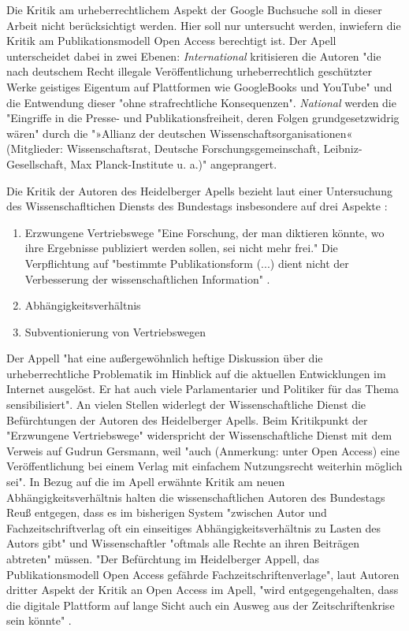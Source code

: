 Die Kritik am urheberrechtlichem Aspekt der Google Buchsuche soll in dieser Arbeit nicht berücksichtigt werden. Hier soll nur untersucht werden, inwiefern die Kritik am Publikationsmodell Open Access berechtigt ist. Der Apell unterscheidet dabei in zwei Ebenen: \textit{International} kritisieren die Autoren "die nach deutschem Recht illegale Veröffentlichung urheberrechtlich geschützter Werke geistiges Eigentum auf Plattformen wie GoogleBooks und YouTube" und die Entwendung dieser "ohne strafrechtliche Konsequenzen". \textit{National} werden die "Eingriffe in die Presse- und Publikationsfreiheit, deren Folgen grundgesetzwidrig wären" durch die "»Allianz der deutschen Wissenschaftsorganisationen« (Mitglieder: Wissenschaftsrat, Deutsche Forschungsgemeinschaft, Leibniz-Gesellschaft, Max Planck-Institute u. a.)" angeprangert.\cite{ITK_2009}

Die Kritik der Autoren des Heidelberger Apells bezieht laut einer Untersuchung des Wissenschafltichen Diensts des Bundestags insbesondere auf drei Aspekte \cite{WD_bundestag_2009}:
\begin{enumerate}
\item Erzwungene Vertriebswege
"Eine Forschung, der man diktieren könnte, wo ihre Ergebnisse publiziert werden sollen, sei nicht mehr frei." Die Verpflichtung auf "bestimmte Publikationsform (...) dient nicht der Verbesserung der wissenschaftlichen Information" \cite{ITK_2009}.
\item Abhängigkeitsverhältnis
\item Subventionierung von Vertriebswegen
\end{enumerate}

Der Appell "hat eine außergewöhnlich heftige Diskussion über die urheberrechtliche Problematik im Hinblick auf die aktuellen Entwicklungen im Internet ausgelöst. Er hat auch viele Parlamentarier und Politiker für das Thema sensibilisiert"\cite{WD_bundestag_2009}. An vielen Stellen widerlegt der Wissenschaftliche Dienst die Befürchtungen der Autoren des Heidelberger Apells. Beim Kritikpunkt der "Erzwungene Vertriebswege" widerspricht der Wissenschaftliche Dienst mit dem Verweis auf Gudrun Gersmann, weil "auch (Anmerkung: unter Open Access) eine Veröffentlichung bei einem Verlag mit einfachem Nutzungsrecht weiterhin möglich sei". In Bezug auf die im Apell erwähnte Kritik am neuen Abhängigkeitsverhältnis halten die wissenschaftlichen Autoren des Bundestags Reuß entgegen, dass es im bisherigen System "zwischen Autor und Fachzeitschriftverlag oft ein einseitiges Abhängigkeitsverhältnis zu Lasten des Autors gibt" und Wissenschaftler "oftmals alle Rechte an ihren Beiträgen abtreten" \cite{WD_bundestag_2009} müssen. "Der Befürchtung im Heidelberger Appell, das Publikationsmodell Open Access gefährde Fachzeitschriftenverlage", laut Autoren dritter Aspekt der Kritik an Open Access im Apell, "wird entgegengehalten, dass die digitale Plattform auf lange Sicht auch ein Ausweg aus der Zeitschriftenkrise sein könnte" \cite{WD_bundestag_2009}.

